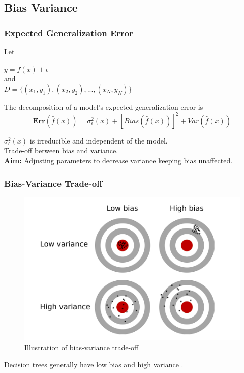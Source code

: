 
\subsection{Bias Variance}

\begin{frame}
    \frametitle{Expected Generalization Error}
    Let 
    \begin{center}
        $y = f(x) + \epsilon$ \\
        and\\
        $D = \{(x_{1},y_{1}), (x_{2}, y_{2}), ... , (x_{N}, y_{N})\}$
    \end{center}   
    The decomposition of a model's expected generalization error is
    \begin{equation}
        \boldsymbol{Err}(\hat{f}(x)) = \sigma_{\epsilon}^2(x) + [Bias(\hat{f}(x))]^2 + Var(\hat{f}(x))
    \end{equation}
    
    $\sigma_{\epsilon}^2(x)$ is irreducible and independent of the model. \\
    \bigskip
    Trade-off between bias and variance. \\
    \textbf{Aim:} Adjusting parameters to decrease variance keeping bias unaffected.
\end{frame}

\begin{frame}
    \frametitle{Bias-Variance Trade-off}
    \begin{figure}      
        \includegraphics{images/bias-variance.png}
        \caption{Illustration of bias-variance trade-off \cite{van2019bias}}
    \end{figure}
    Decision trees generally have low bias and high variance \cite{friedman2001elements}.

\end{frame}

